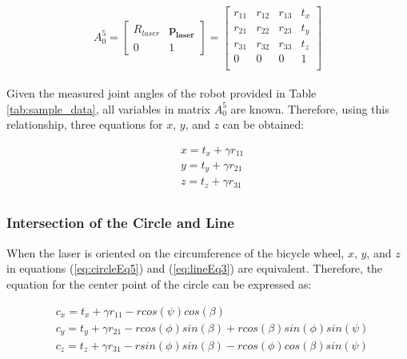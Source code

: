 \documentclass[12pt]{article}
\begin{document}
\begin{equation}
	A_0^5 =
     \begin{bmatrix}
       R_{laser} & \mathbf{p_{laser}} \\ 
       0 & 1
    \end{bmatrix}=
    \begin{bmatrix}
       r_{11} & r_{12} & r_{13} & t_x \\
       r_{21} & r_{22} & r_{23} & t_y \\
       r_{31} & r_{32} & r_{33} & t_z \\
       0 & 0 & 0 & 1 \\
    \end{bmatrix}
    \label{eq:lineTMatrix}
\end{equation}
\\
Given the measured joint angles of the robot provided in Table \ref{tab:sample_data}, all  variables in matrix $A_0^5$ are known. Therefore, using this relationship, three equations for $x$, $y$, and $z$ can be obtained:

\begin{equation}
  \begin{split}
          & x = t_x + \gamma r_{11} \\
          & y = t_y + \gamma r_{21} \\
          & z = t_z + \gamma r_{31} \\  
  \label{eq:lineEq3}
  \end{split}
\end{equation}

\subsubsection{Intersection of the Circle and Line}

When the laser is oriented on the circumference of the bicycle wheel, $x$, $y$, and $z$ in equations (\ref{eq:circleEq5}) and (\ref{eq:lineEq3}) are equivalent.  Therefore, the equation for the center point of the circle can be expressed as:

\begin{equation}
  \begin{split}
          & c_x = t_x + \gamma r_{11} - rcos(\psi)cos(\beta) \\
          & c_y =  t_y + \gamma r_{21} - rcos(\phi)sin(\beta) + rcos(\beta)sin(\phi)sin(\psi) \\
          & c_z = t_z + \gamma r_{31} - rsin(\phi)sin(\beta) - rcos(\phi)cos(\beta)sin(\psi) \\  
  \label{eq:lineAndcircle}
  \end{split}
\end{equation}
\end{document}
